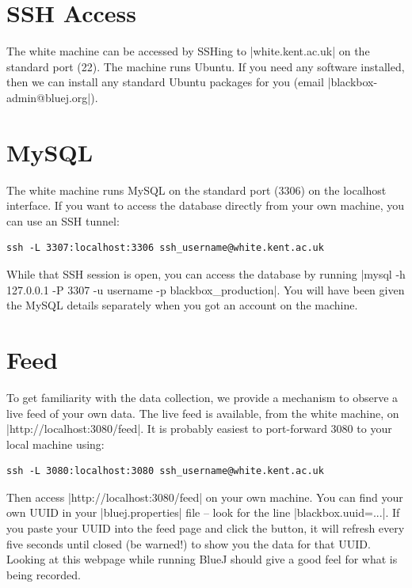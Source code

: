 \documentclass{report}
\begin{document}
\section{SSH Access}

The white machine can be accessed by SSHing to |white.kent.ac.uk| on the
standard port (22).  The machine runs Ubuntu.  If you need any software
installed, then we can install any standard Ubuntu packages for you (email
|blackbox-admin@bluej.org|).

\section{MySQL}
\label{sec:ssh-tunnel}

The white machine runs MySQL on the standard port (3306) on the localhost
interface.  If you want to access the database directly from your own machine,
you can use an SSH tunnel:

\begin{lstlisting}
ssh -L 3307:localhost:3306 ssh_username@white.kent.ac.uk
\end{lstlisting}

While that SSH session is open, you can access the database by running
|mysql -h 127.0.0.1 -P 3307 -u username -p blackbox_production|.  You will have been given
the MySQL details separately when you got an account on the machine.

\section{Feed}

To get familiarity with the data collection, we provide a mechanism to observe
a live feed of your own data.  The live feed is available, from the
white machine, on |http://localhost:3080/feed|.  It is probably easiest to
port-forward 3080 to your local machine using:

\begin{lstlisting}
ssh -L 3080:localhost:3080 ssh_username@white.kent.ac.uk
\end{lstlisting}

Then access |http://localhost:3080/feed| on your own machine.  You can find
your own UUID in your |bluej.properties| file -- look for the line
|blackbox.uuid=...|.  If you paste your UUID into the feed page and click the
button, it will refresh every five seconds until closed (be warned!) to show
you the data for that UUID.  Looking at this webpage while running BlueJ
should give a good feel for what is being recorded.
\end{document}
